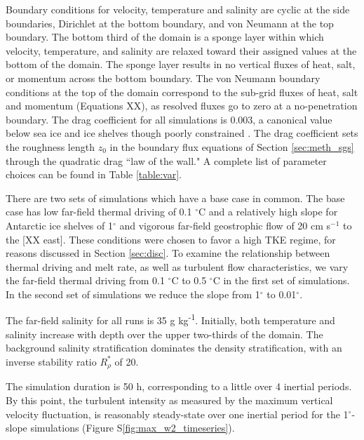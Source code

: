 \documentclass[draft]{styles/agujournal2019}
\begin{document}
Boundary conditions for velocity, temperature and salinity are cyclic at the side boundaries, Dirichlet at the bottom boundary, and von Neumann at the top boundary. The bottom third of the domain is a sponge layer within which velocity, temperature, and salinity are relaxed toward their assigned values at the bottom of the domain. The sponge layer results in no vertical fluxes of heat, salt, or momentum across the bottom boundary. The von Neumann boundary conditions at the top of the domain correspond to the sub-grid fluxes of heat, salt and momentum (Equations XX), as resolved fluxes go to zero at a no-penetration boundary. The drag coefficient for all simulations is 0.003, a canonical value below sea ice and ice shelves though poorly constrained \cite{XX}. The drag coefficient sets the roughness length $z_0$ in the boundary flux equations of Section \ref{sec:meth_sgs} through the quadratic drag ``law of the wall." A complete list of parameter choices can be found in Table \ref{table:var}.

There are two sets of simulations which have a base case in common. The base case has low far-field thermal driving of 0.1 $^{\circ}$C and a relatively high slope for Antarctic ice shelves of 1$^{\circ}$ and vigorous far-field geostrophic flow of 20 cm s$^{-1}$ to the [XX east]. These conditions were chosen to favor a high TKE regime, for reasons discussed in Section \ref{sec:disc}. To examine the relationship between thermal driving and melt rate, as well as turbulent flow characteristics, we vary the far-field thermal driving from 0.1 $^{\circ}$C to 0.5 $^{\circ}$C in the first set of simulations. In the second set of simulations we reduce the slope from 1$^{\circ}$ to 0.01$^{\circ}$. 

The far-field salinity for all runs is 35 g kg\textsuperscript{-1}. Initially, both temperature and salinity increase with depth over the upper two-thirds of the domain. The background salinity stratification dominates the density stratification, with an inverse stability ratio $R_\rho^*$ of 20. 

The simulation duration is 50 h, corresponding to a little over 4 inertial periods. By this point, the turbulent intensity as measured by the maximum vertical velocity fluctuation, is reasonably steady-state over one inertial period for the 1$^{\circ}$-slope simulations (Figure S\ref{fig:max_w2_timeseries}). 
\end{document}
